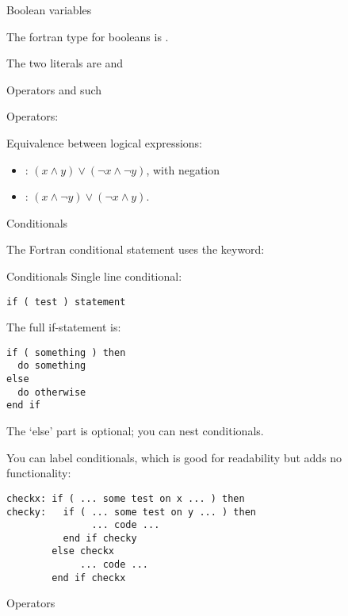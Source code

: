 
 {Boolean variables}

The fortran type for booleans is .

The two literals are  and 

 {Operators and such}

Operators:   

Equivalence between logical expressions:
\begin{itemize}
\item {} : $ (x\wedge y)\vee (\neg x\wedge \neg y)$, with
  negation
\item {} : $ (x\wedge \neg y)\vee (\neg x\wedge  y)$.
\end{itemize}


 {Conditionals}
\label{sec:iff}

The Fortran conditional statement uses the  keyword:

\begin{block}{Conditionals}
  \label{sl:fconditional}
Single line conditional:
\begin{verbatim}
if ( test ) statement
\end{verbatim}
The full if-statement is:
\begin{verbatim}
if ( something ) then
  do something
else
  do otherwise
end if
\end{verbatim}
The `else' part is optional; you can nest conditionals.
\end{block}

You can label conditionals, which is good for readability but adds no functionality:
\begin{verbatim}
checkx: if ( ... some test on x ... ) then
checky:   if ( ... some test on y ... ) then
               ... code ...
          end if checky
        else checkx
             ... code ...
        end if checkx   
\end{verbatim}

 {Operators}

